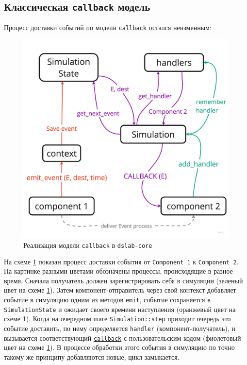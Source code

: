 \subsection{Классическая \texttt{callback} модель}
Процесс доставки событий по модели \texttt{callback} остался неизменным: 
\nopagebreak
\begin{figure}[H]
    \centering
    \includegraphics[width=0.7\linewidth]{images/dslab-core-callback.pdf}
    \caption{Реализация модели \texttt{callback} в \texttt{dslab-core}}
    \label{dslab_inner}
\end{figure}

На схеме \ref{dslab_inner} показан процесс доставки события от \texttt{Component~1} к \texttt{Component~2}. На картинке разными цветами обозначены процессы, происходящие в разное время. Сначала получатель должен зарегистрировать себя в симуляции (зеленый цвет на схеме \ref{dslab_inner}). Затем компонент-отправитель через свой контекст добавляет событие в симуляцию одним из методов \texttt{emit}, событие сохраняется в \texttt{SimulationState} и ожидает своего времени наступления (оранжевый цвет на схеме \ref{dslab_inner}). Когда на очередном шаге \hyperref[Simulation::step]{\texttt{Simulation::step}} приходит очередь это событие доставить, по нему определяется \texttt{handler} (компонент-получатель), и вызывается соответствующий \hyperref[fnon]{\texttt{callback}} с пользовательским кодом (фиолетовый цвет на схеме \ref{dslab_inner}). В процессе обработки этого события в симуляцию по точно такому же принципу добавляются новые, цикл замыкается.


